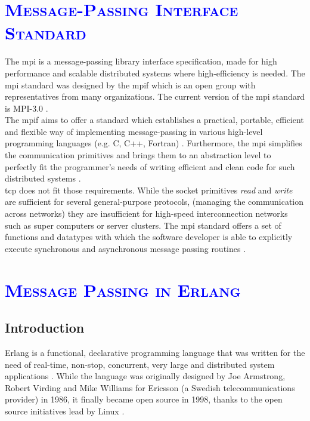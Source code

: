 \documentclass[xcolor=dvipsnames]{article}
\begin{document}
\section{\scshape{\textcolor{blue}{Message-Passing Interface Standard}}} \label{message_passing_interface}

The \gls{mpi} is a message-passing library interface specification, made for high performance and scalable distributed systems where high-efficiency is needed.  The \gls{mpi} standard was designed by the \gls{mpif} which is an open group with representatives from many organizations. The current version of the \gls{mpi} standard is MPI-3.0 \cite[ch. Abstract/ii \& Acknowledgements/xx \& 1.1 on p. 1]{mpi}.\\

\noindent The \gls{mpif} aims to offer a standard which establishes a practical, portable, efficient and flexible way of implementing message-passing in various high-level programming languages (e.g. C, C++, Fortran) \cite[ch. History/iii]{mpi}. Furthermore, the \gls{mpi} simplifies the communication primitives and brings them to an abstraction level to perfectly fit the programmer's needs of writing efficient and clean code for such distributed systems \cite{tanenbaum}.\\

\noindent \gls{tcp} does not fit those requirements. While the socket primitives \textit{read} and \textit{write} are sufficient for several general-purpose protocols, (managing the communication across networks) they are insufficient for high-speed interconnection networks such as super computers or server clusters. The \gls{mpi} standard offers a set of functions and datatypes with which the software developer is able to explicitly execute synchronous and asynchronous message passing routines \cite[ch. 4.3 on p. 143]{tanenbaum}.\\

\section{\scshape{\textcolor{blue}{Message Passing in Erlang}}} \label{erlang}

\subsection{Introduction}

Erlang is a functional, declarative programming language that was written for the need of real-time, non-stop, concurrent, very large and distributed system applications \cite[chap. 1 / p. 1]{Armstrong96erlang}. While the language was originally designed by Joe Armstrong, Robert Virding and Mike Williams for Ericsson (a Swedish telecommunications provider) in 1986, it finally became open source in 1998, thanks to the open source initiatives lead by Linux \cite[chap. 8 on p. 39]{erl_history}.\\
\end{document}
